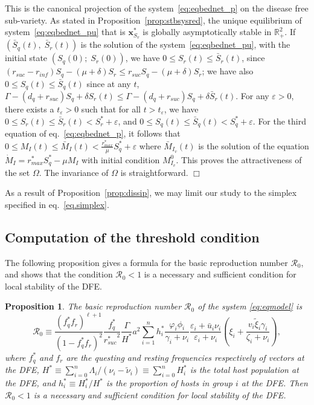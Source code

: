 \documentclass[a4paper]{article}
\newcommand{\edem}{\hfill $\Box$ }
\newcommand{\dsum}{\displaystyle\sum}
\newcommand{\biVar }{h_{i} }
\newcommand{\varphiVar}{r_{inf}}
\newcommand{\varpiVar}{r_{suc}}
\newcommand{\hatmuVar}{d_q}
\newtheorem{prop}{Proposition}[section]
\begin{document}
\noindent This is the canonical projection of the system~\eqref{eq:eqbednet_p} on the disease free sub-variety. As stated in Proposition~\ref{prop:stbsysred}, the unique equilibrium of system~\eqref{eq:eqbednet_pu} that is $\mathbf x_{S_v}^*$ is globally asymptotically stable in $\mathbb R^2_+$.  If $(\bar S_q(t),\;\bar S_r(t))$ is the solution of the system~\eqref{eq:eqbednet_pu}, with the initial state $(S_q(0);\;S_r(0))$,  
we have $0\leqslant S_r(t)\leqslant\bar S_r(t)$, since $(\varpiVar -\varphiVar )S_q-(\mu+\delta)S_r\leqslant \varpiVar  S_q-(\mu+\delta)S_r$; we have also $0\leqslant S_q(t)\leqslant\bar S_q(t)$ since at any $t$, $\Gamma-(\hatmuVar +\varpiVar )S_q+\delta S_r(t)\leqslant \Gamma-(\hatmuVar +\varpiVar )S_q+\delta \bar S_r(t)$. For any $\varepsilon>0$, there exists a $t_\varepsilon>0$ such that for all $t>t_\varepsilon$, we have  $0\leqslant S_r(t)\leqslant\bar S_r(t)<S_r^*+\varepsilon$, and $0\leqslant S_q(t)\leqslant\bar S_q(t)<S_q^*+\varepsilon$. For the third equation of eq.~\eqref{eq:eqbednet_p}, it follows that $0\leqslant M_{I}(t)\leqslant\bar M_{I}(t)<\frac{r^*_{max}}{\mu}S^*_q+\varepsilon$ where $\bar M_{I_v}(t)$ is the solution of the equation $\dot M_{I}=r^*_{max}  S_q^*-\mu M_{I}$ with initial condition $M_{I_v}^0$. This proves the attractiveness of the set $\Omega$. The invariance of $\Omega$ is straightforward. \edem 

As a result of Proposition~\ref{prop:dissip}, we may limit our study to the simplex specified in eq.~\eqref{eq.simplex}.


\subsection{Computation of the threshold condition}\label{sec.algo}
The following proposition gives a formula for the basic reproduction number $\mathcal R_0$, and  shows that the condition $\mathcal R_0<1$ is a necessary and sufficient condition  for local stability of the DFE. 

\begin{prop}\label{prop:basicrepn}
The basic reproduction number $\mathcal R_0$ of the system \eqref{eq:eqmodel} is 
\begin{equation}
\label{eq:R0} \mathcal
R_0 \equiv \frac{({f_q^*}f_r)^{\ell+1}}{(1-f_q^*f_r)^2}\dfrac{f_q^*}{{\varpiVar ^*}^2}\dfrac{\Gamma}{H^*}a^2\sum_{i=1}^nh_i^*\frac{\varphi_i\phi_i}{\gamma_i+\nu_i}\frac{\varepsilon_i+\bar u_i\nu_i }{\varepsilon_i+\nu_i}\left(\xi_{i}+\frac{v_i\widetilde \xi_{i}\gamma_i}{\zeta_i+\nu_i}\right),
\end{equation}  
where $f^*_q$ and $f_r$ are the questing and resting frequencies respectively of vectors at the DFE, $H^*\equiv {\dsum_{i=0}^n}\Lambda_i/({\nu_i-\widetilde \nu_i})\equiv {\dsum_{i=0}^n}H^*_i$ is the total host population at the DFE, and $\biVar^*\equiv {H^*_i}/{H^*}$ is the proportion of hosts in group $i$ at the DFE. Then $\mathcal R_0<1$ is a necessary and sufficient condition  for local stability of the DFE. 

\end{prop}
\end{document}
